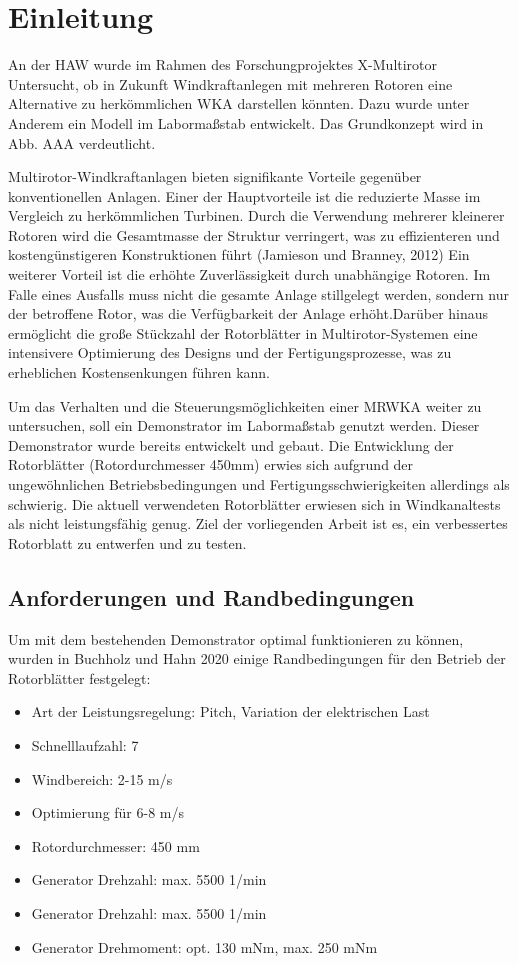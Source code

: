 \chapter{Einleitung}


An der HAW wurde im Rahmen des Forschungprojektes X-Multirotor Untersucht, ob in Zukunft Windkraftanlegen mit mehreren Rotoren eine Alternative zu herkömmlichen WKA darstellen könnten. Dazu wurde unter Anderem ein Modell im Labormaßstab entwickelt. Das Grundkonzept wird in Abb. AAA verdeutlicht.

Multirotor-Windkraftanlagen bieten signifikante Vorteile gegenüber konventionellen Anlagen. Einer der Hauptvorteile ist die reduzierte Masse im Vergleich zu herkömmlichen Turbinen. Durch die Verwendung mehrerer kleinerer Rotoren wird die Gesamtmasse der Struktur verringert, was zu effizienteren und kostengünstigeren Konstruktionen führt (Jamieson und Branney, 2012) Ein weiterer Vorteil ist die erhöhte Zuverlässigkeit durch unabhängige Rotoren. Im Falle eines Ausfalls muss nicht die gesamte Anlage stillgelegt werden, sondern nur der betroffene Rotor, was die Verfügbarkeit der Anlage erhöht.Darüber hinaus ermöglicht die große Stückzahl der Rotorblätter in Multirotor-Systemen eine intensivere Optimierung des Designs und der Fertigungsprozesse, was zu erheblichen Kostensenkungen führen kann.

Um das Verhalten und die Steuerungsmöglichkeiten einer MRWKA weiter zu untersuchen, soll ein Demonstrator im Labormaßstab genutzt werden. Dieser Demonstrator wurde bereits entwickelt und gebaut. Die Entwicklung der Rotorblätter (Rotordurchmesser 450mm) erwies sich aufgrund der ungewöhnlichen Betriebsbedingungen und Fertigungsschwierigkeiten allerdings als schwierig. Die aktuell verwendeten Rotorblätter erwiesen sich in Windkanaltests als nicht leistungsfähig genug. Ziel der vorliegenden Arbeit ist es, ein verbessertes Rotorblatt zu entwerfen und zu testen.
\section{Anforderungen und Randbedingungen}
Um mit dem bestehenden Demonstrator optimal funktionieren zu können, wurden in Buchholz und Hahn 2020 einige Randbedingungen für den Betrieb der Rotorblätter festgelegt:
\begin{itemize}
    \item Art der Leistungsregelung: Pitch, Variation der elektrischen Last
    \item Schnelllaufzahl: 7
    \item Windbereich: 2-15 m/s
    \item Optimierung für 6-8 m/s
    \item Rotordurchmesser: 450 mm
    \item Generator Drehzahl: max. 5500 1/min
    \item Generator Drehzahl: max. 5500 1/min
    \item Generator Drehmoment: opt. 130 mNm, max. 250 mNm
\end{itemize}

